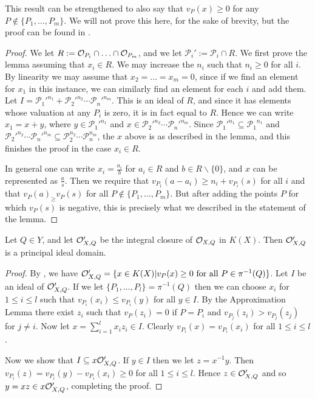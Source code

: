     \begin{rem}
    This result can be strengthened to also say that $v_P(x) \geq 0$ for any $P\notin \{P_1,\ldots ,P_m\}$.
    We will not prove this here, for the sake of brevity, but the proof can be found in \cite[Chap. 1, \S 3, pg. 12]{localfields}.
    \end{rem}
    \begin{proof}
    We let $R:= {\cal O}_{P_i} \cap \ldots \cap {\cal O}_{P_m}$, and we let $\mathcal{P}_i' := \mathcal{P}_i \cap R$.
    We first prove the lemma assuming that $x_i \in R$.
    We may increase the $n_i$ such that $n_i\geq 0$ for all $i$.
    By linearity we may assume that $x_2 = \ldots = x_m = 0$, since if we find an element for $x_1$ in this instance, we can similarly find an element for each $i$ and add them.
    Let $I = {\mathcal{P}_1'}^{n_1} + {\mathcal{P}_2'}^{n_2}\cdots {\mathcal{P}_n'}^{n_m}$.
    This is an ideal of $R$, and since it has elements whose valuation at any $P_i$ is zero, it is in fact equal to $R$.
    Hence we can write $x_1 = x + y$, where $y \in {\mathcal{P}_1'}^{n_1}$ and $x\in {\mathcal{P}_2'}^{n_2}\cdots {\mathcal{P}_n'}^{n_m}$.
    Since ${\mathcal{P}_1'}^{n_1} \subseteq {\mathcal{P}_1}^{n_1}$ and ${\mathcal{P}_2'}^{n_2}\cdots {\mathcal{P}_n'}^{n_m} \subseteq \mathcal{P}_2^{n_2}\cdots \mathcal{P}_n^{n_m}$, the $x$ above is as described in the lemma, and this finishes the proof in the case $x_i \in R$.
    
    
    In general one can write $x_i = \frac{a_i}{b}$ for $a_i\in R$ and $b\in R\backslash \{0\}$, and $x$ can be represented as $\frac{a}{s}$.
    Then we require that $v_{P_1}(a-a_i) \geq n_i + v_{P_i}(s)$ for all $i$ and that $v_P(a)_ \geq v_P(s)$ for all $P\notin \{P_1,\ldots ,P_m\}$.
    But after adding the points $P$ for which $v_P(s)$ is negative, this is precisely what we described in the statement of the lemma.
    \end{proof}

    \begin{lem}\label{pidlemma}
    Let $Q\in Y$, and let ${\cal O}_{X,Q}'$ be the integral closure of ${\cal O}_{X,Q}$ in $K(X)$.
    Then ${\cal O}_{X,Q}'$ is a principal ideal domain.
    \end{lem}
    \begin{proof}
    By \cite[Cor. 3.3.5]{stichtenoth}, we have ${\cal O}_{X,Q}' = \{x\in K(X)|v_P(x) \geq 0 \ \text{for all} \ P\in \pi^{-1}(Q)\}$.
    Let $I$ be an ideal of ${\cal O}_{X,Q}'$.
    If we let $\{P_1,\ldots, P_l\} = \pi^{-1}(Q)$ then we can choose $x_i$ for $1\leq i \leq l$ such that $v_{P_i}(x_i) \leq v_{P_i}(y)$ for all $y\in I$.
    By the Approximation Lemma there exist $z_i$ such that $v_P (z_i) = 0$ if $P=P_i$ and $v_{P_j}(z_i) > v_{P_j}(z_j)$ for $j\neq i$.
    Now let $x = \sum_{i=1}^l x_iz_i \in I$.
    Clearly $v_{P_i}(x) = v_{P_i}(x_i)$ for all $1\leq i\leq l$.
    
    
    
    Now we show that $I \subseteq x{\cal O}_{X,Q}'$.
    If $y\in I$ then we let $z = x^{-1}y$.
    Then $v_{P_i}(z) = v_{P_i}(y) - v_{P_i}(x_i) \geq 0$ for all $1\leq i\leq l$.
    Hence $z\in {\cal O}_{X,Q}'$ and so $y = xz \in x{\cal O}_{X,Q}'$, completing the proof.
    \end{proof}


